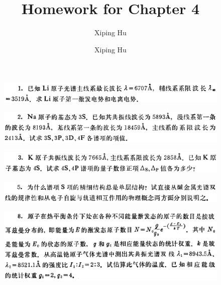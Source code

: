 \documentclass{article}
\author{Xiping Hu}
\author{Xiping Hu}
\affil{https://hxp.plus/}
\title{Homework for Chapter 4}
\begin{document}
\maketitle

\begin{figure}[H]
  \centering
  \includegraphics[width=\linewidth]{figures/1}
  \label{fig:}
\end{figure}

\begin{figure}[H]
  \centering
  \includegraphics[width=\linewidth]{figures/2}
  \label{fig:}
\end{figure}

\begin{figure}[H]
  \centering
  \includegraphics[width=\linewidth]{figures/3}
  \label{fig:}
\end{figure}

\begin{figure}[H]
  \centering
  \includegraphics[width=\linewidth]{figures/5}
  \label{fig:}
\end{figure}

\begin{figure}[H]
  \centering
  \includegraphics[width=\linewidth]{figures/8}
  \label{fig:}
\end{figure}
\end{document}
